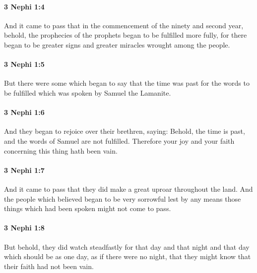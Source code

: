 		\paragraph{3 Nephi 1:4} %
			\label{3NEPHI-1-4}

			And it came to pass that in the commencement of the ninety and second year,
			behold, the prophecies of the prophets began to be fulfilled more fully,
			for there began to be greater signs and greater miracles wrought among the people.

		\paragraph{3 Nephi 1:5} %
			\label{3NEPHI-1-5}

			But there were some which began to say
			that the time was past for the words to be fulfilled
			which was spoken by Samuel the Lamanite.

		\paragraph{3 Nephi 1:6} %
			\label{3NEPHI-1-6}

			And they began to rejoice over their brethren, saying:
			Behold, the time is past, and the words of Samuel are not fulfilled.
			Therefore your joy and your faith concerning this thing hath been vain.

		\paragraph{3 Nephi 1:7} %
			\label{3NEPHI-1-7}

			And it came to pass that they did make a great uproar throughout the land.
			And the people which believed began to be very sorrowful
			lest by any means those things which had been spoken might not come to pass.

		\paragraph{3 Nephi 1:8} %
			\label{3NEPHI-1-8}

			But behold, they did watch steadfastly for that day and that night and that day
			which should be as one day, as if there were no night,
			that they might know that their faith had not been vain.

